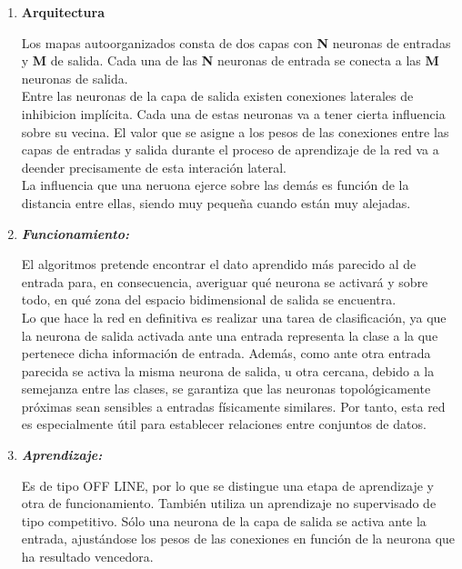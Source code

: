 \documentclass[journal]{IEEEtran}
\begin{document}
\begin{enumerate}
\item \textbf{Arquitectura}

Los mapas autoorganizados consta de dos capas con \textbf{N} neuronas de entradas y \textbf{M} de salida. Cada una de las \textbf{N} neuronas de entrada se conecta a las \textbf{M} neuronas de salida.\\

Entre las neuronas de la capa de salida existen conexiones laterales de inhibicion implícita. Cada una de estas neuronas va a tener cierta influencia sobre su vecina. El valor que se asigne a los pesos de las conexiones entre las capas de entradas y salida durante el proceso de aprendizaje de la red va a deender precisamente de esta interación lateral.\\

La influencia que una neruona ejerce sobre las demás es función de la distancia entre ellas, siendo muy pequeña cuando están muy alejadas.\\

\item \textbf{\emph{Funcionamiento:}}

El algoritmos pretende encontrar el dato aprendido más parecido al de entrada para, en consecuencia, averiguar qué neurona se activará y sobre todo, en qué zona del espacio bidimensional de salida se encuentra.\\

Lo que hace la red en definitiva es realizar una tarea de clasificación, ya que la neurona de salida activada ante una entrada representa la clase a la que pertenece dicha información de entrada. Además, como ante otra entrada parecida se activa la misma neurona de salida, u otra cercana, debido a la semejanza entre las clases, se garantiza que las neuronas topológicamente próximas sean sensibles a entradas físicamente similares. Por tanto, esta red es especialmente útil para establecer relaciones entre conjuntos de datos.	\\
	
\item \textbf{\emph{Aprendizaje:}}
		
Es de tipo OFF LINE, por lo que se distingue una etapa de aprendizaje y otra de funcionamiento. También utiliza un aprendizaje no supervisado de tipo competitivo. Sólo una neurona de la capa de salida se activa ante la entrada, ajustándose los pesos de las conexiones en función de la neurona que ha resultado vencedora.\\


\end{enumerate}
\end{document}
